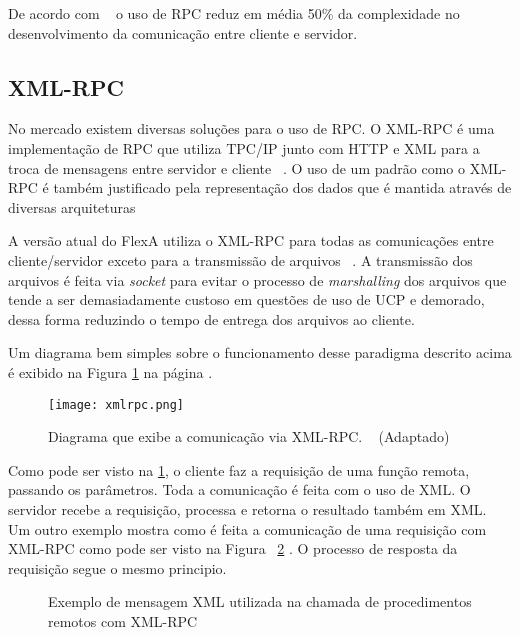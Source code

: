     De acordo com ~\cite{rpc} o uso de RPC reduz em média 50\% da complexidade no desenvolvimento da comunicação entre cliente e servidor.
    
    \subsection{XML-RPC}
    
    No mercado existem diversas soluções para o uso de RPC. O XML-RPC é uma implementação de RPC que utiliza TPC/IP junto com HTTP e XML para a troca de mensagens entre servidor e cliente ~\cite{xmlrpc}. O uso de um padrão como o XML-RPC é também justificado pela representação dos dados que é mantida através de diversas arquiteturas ~\cite{xmlrpcMessage}
    
    A versão atual do FlexA utiliza o XML-RPC para todas as comunicações entre cliente/servidor exceto para a transmissão de arquivos ~\cite{mario}. A transmissão dos arquivos é feita via \textit{socket} para evitar o processo de \textit{marshalling} dos arquivos que tende a ser demasiadamente custoso em questões de uso de UCP e demorado, dessa forma reduzindo o tempo de entrega dos arquivos ao cliente.
    
    Um diagrama bem simples sobre o funcionamento desse paradigma descrito acima é exibido na Figura \ref{fig:xmlrpc} na página .
    
    \begin{figure}[ht]
    \centering
    \texttt{[image: xmlrpc.png]}
    \caption{Diagrama que exibe a comunicação via XML-RPC. ~\cite{xmlrpc} (Adaptado)}
    \label{fig:xmlrpc}
    \end{figure}
    
    Como pode ser visto na \ref{fig:xmlrpc}, o cliente faz a requisição de uma função remota, passando os parâmetros. Toda a comunicação é feita com o uso de XML. O servidor recebe a requisição, processa e retorna o resultado também em XML. Um outro exemplo mostra como é feita a comunicação de uma requisição com XML-RPC como pode ser visto na Figura ~\ref{fig:xmlrpcMessage} . O processo de resposta da requisição segue o mesmo principio.
    
    \begin{figure}[ht]
    \centering
    \caption{Exemplo de mensagem XML utilizada na chamada de procedimentos remotos com XML-RPC}
    \label{fig:xmlrpcMessage}
    \end{figure}


